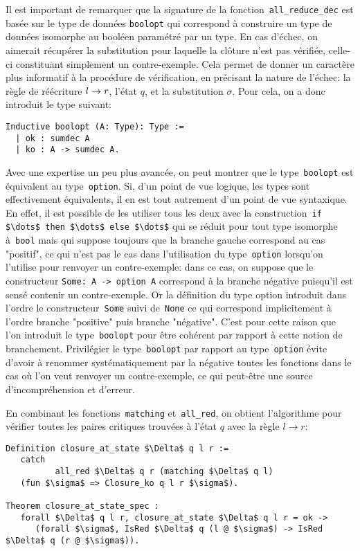 Il est important de remarquer que la signature de la fonction~\lstinline!all_reduce_dec! est basée
sur le type de données \lstinline!boolopt! qui correspond à construire un type de données
isomorphe au booléen paramétré par un type. En cas d'échec, 
on aimerait récupérer la substitution pour laquelle la clôture n'est pas vérifiée, celle-ci
constituant simplement un contre-exemple. Cela permet de donner un caractère plus informatif à la procédure
de vérification, en précisant la nature de l'échec: la règle de réécriture $l \rightarrow r$, l'état $q$, et la substitution $\sigma$. 
Pour cela, on a donc introduit le type suivant:
\begin{lstlisting}
Inductive boolopt (A: Type): Type :=
  | ok : sumdec A
  | ko : A -> sumdec A.
\end{lstlisting}
Avec une expertise un peu plus avancée, on peut montrer que  le type~\lstinline!boolopt! est
équivalent au type~\lstinline!option!. Si, d'un point de vue logique, les types sont effectivement équivalents,
il en est tout autrement d'un point de vue syntaxique. En effet, il est possible de les utiliser tous les deux
avec la construction~\lstinline!if $\dots$ then $\dots$ else $\dots$! qui se réduit pour tout type isomorphe
à~\lstinline!bool! mais qui suppose toujours que la branche gauche correspond au cas "positif", ce qui n'est pas le cas
dans l'utilisation du type~\lstinline!option! lorsqu'on l'utilise pour renvoyer un contre-exemple: dans ce cas, on suppose
que le constructeur \lstinline!Some: A -> option A! correspond à la branche négative puisqu'il est sensé contenir un
contre-exemple. Or la définition du type option introduit dans l'ordre le constructeur~\lstinline!Some! suivi 
de~\lstinline!None! ce qui correspond implicitement à l'ordre branche "positive" puis branche "négative".
C'est pour cette raison que l'on introduit le type~\lstinline!boolopt! pour être cohérent par rapport à cette notion
de branchement. Privilégier le type~\lstinline!boolopt! par rapport au type~\lstinline!option! évite d'avoir à renommer
systématiquement par la négative toutes les fonctions dans le cas où l'on veut renvoyer un contre-exemple, 
ce qui peut-être une source d'incompréhension et d'erreur. 

En combinant les fonctions~\lstinline!matching! et~\lstinline!all_red!, 
on obtient l'algorithme pour vérifier toutes les paires critiques 
trouvées à l'état $q$ avec la règle $l \rightarrow r$:

\begin{lstlisting}
Definition closure_at_state $\Delta$ q l r := 
   catch
          all_red $\Delta$ q r (matching $\Delta$ q l)
   (fun $\sigma$ => Closure_ko q l r $\sigma$).

Theorem closure_at_state_spec : 
   forall $\Delta$ q l r, closure_at_state $\Delta$ q l r = ok -> 
      (forall $\sigma$, IsRed $\Delta$ q (l @ $\sigma$) -> IsRed $\Delta$ q (r @ $\sigma$)).
\end{lstlisting}

